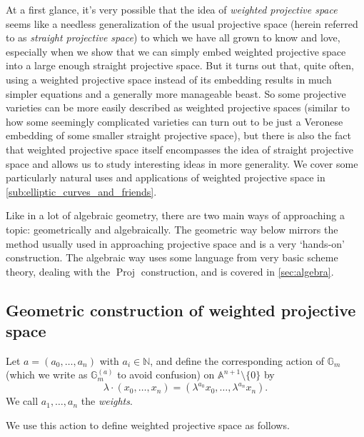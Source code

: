 \documentclass[10pt,notitlepage]{article}
\numberwithin{equation}{subsection}
\DeclareMathOperator{\proj}{Proj}
\newcommand{\aff}{\mathbb{A}}
\newcommand{\gm}{\mathbb{G}_m}
\newcommand{\bb}[1]{\mathbb{#1}}
\newcommand{\noz}{\setminus\{0\}}
\begin{document}
At a first glance, it's very possible that the idea of \emph{weighted projective space} seems like a needless generalization of the usual projective space (herein referred to as \emph{straight projective space}) to which we have all grown to know and love, especially when we show that we can simply embed weighted projective space into a large enough straight projective space.
But it turns out that, quite often, using a weighted projective space instead of its embedding results in much simpler equations and a generally more manageable beast.
So some projective varieties can be more easily described as weighted projective spaces (similar to how some seemingly complicated varieties can turn out to be just a Veronese embedding of some smaller straight projective space), but there is also the fact that weighted projective space itself encompasses the idea of straight projective space and allows us to study interesting ideas in more generality.
We cover some particularly natural uses and applications of weighted projective space in \cref{sub:elliptic_curves_and_friends}.

Like in a lot of algebraic geometry, there are two main ways of approaching a topic: geometrically and algebraically.
The geometric way below mirrors the method usually used in approaching projective space and is a very `hands-on' construction.
The algebraic way uses some language from very basic scheme theory, dealing with the $\proj$ construction, and is covered in \cref{sec:algebra}.



    \subsection{Geometric construction of weighted projective space} %
    \label{sub:geometric_construction}

    \begin{definition}
        Let $a=(a_0,\ldots,a_n)$ with $a_i\in\bb{N}$, and define the corresponding action of $\gm$ (which we write as $\gm^{(a)}$ to avoid confusion) on $\aff^{n+1}\noz$ by
        \begin{equation}
            \lambda\cdot(x_0,\ldots,x_n) = (\lambda^{a_0}x_0,\ldots,\lambda^{a_n}x_n).
        \end{equation}
        We call $a_1,\ldots,a_n$ the \emph{weights}.    
    \end{definition}

    We use this action to define weighted projective space as follows.
\end{document}
